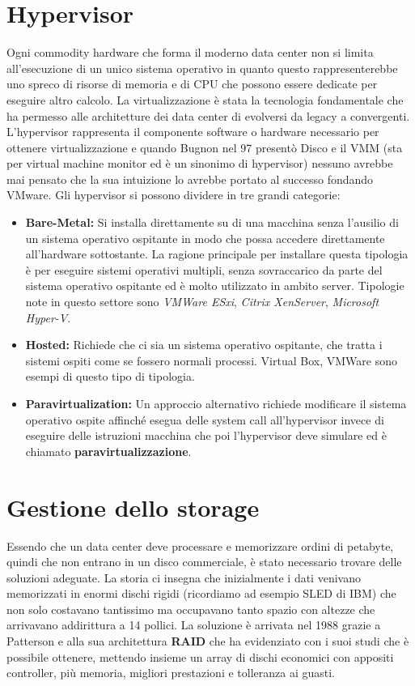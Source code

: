 \section{Hypervisor}
Ogni commodity hardware che forma il moderno data center non si limita all'esecuzione di un unico sistema operativo in quanto questo rappresenterebbe uno spreco di risorse di memoria e di CPU che possono essere dedicate per eseguire altro calcolo. La virtualizzazione è stata la tecnologia fondamentale che ha permesso alle architetture dei data center di evolversi da legacy a convergenti. L'hypervisor rappresenta il componente software o hardware necessario per ottenere virtualizzazione e quando Bugnon nel 97 presentò Disco\cite{bugnon97} e il VMM (sta per virtual machine monitor ed è un sinonimo di hypervisor) nessuno avrebbe mai pensato che la sua intuizione lo avrebbe portato al successo fondando VMware. Gli hypervisor si possono dividere in tre grandi categorie:
\begin{itemize}
	\item \textbf{Bare-Metal:} Si installa direttamente su di una macchina senza l'ausilio di un sistema operativo ospitante in modo che possa accedere direttamente all'hardware sottostante. La ragione principale per installare questa tipologia è per eseguire sistemi operativi multipli, senza sovraccarico da parte del sistema operativo ospitante ed è molto utilizzato in ambito server. Tipologie note in questo settore sono \textit{VMWare ESxi}, \textit{Citrix XenServer}, \textit{Microsoft Hyper-V}.
	\item \textbf{Hosted:} Richiede che ci sia un sistema operativo ospitante, che tratta i sistemi ospiti come se fossero normali processi. Virtual Box, VMWare sono esempi di questo tipo di tipologia.
	\item \textbf{Paravirtualization:} Un approccio alternativo richiede modificare il sistema operativo ospite affinché esegua delle system call all'hypervisor invece di eseguire delle istruzioni macchina che poi l'hypervisor deve simulare ed è chiamato \textbf{paravirtualizzazione}. 
\end{itemize} 
\section{Gestione dello storage}
Essendo che un data center deve processare e memorizzare ordini di petabyte, quindi che non entrano in un disco commerciale, è stato necessario trovare delle soluzioni adeguate. La storia ci insegna che inizialmente i dati venivano memorizzati in enormi dischi rigidi (ricordiamo ad esempio SLED di IBM) che non solo costavano tantissimo ma occupavano tanto spazio con altezze che arrivavano addirittura a 14 pollici. La soluzione è arrivata nel 1988 grazie a Patterson e alla sua architettura \textbf{RAID} che ha evidenziato con i suoi studi \cite{patterson88} che è possibile ottenere, mettendo insieme un array di dischi economici con appositi controller, più memoria, migliori prestazioni e tolleranza ai guasti.
